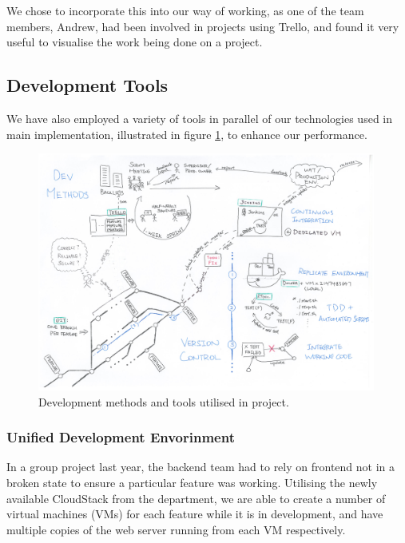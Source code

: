 \documentclass[a4paper, titlepage]{article}
\begin{document}
We chose to incorporate this into our way of working, as one of the team members, Andrew, had been involved in projects using Trello, and found it very useful to visualise the work being done on a project.


\subsection{Development Tools}
We have also employed a variety of tools in parallel of our technologies used
in main implementation, illustrated in figure \ref{fig:projman_devtools}, to
enhance our performance.

\begin{figure}[h!]
  \centering
    \includegraphics[width = 0.99\textwidth]{./projman/devtools.pdf}
  \caption{Development methods and tools utilised in project.}
  \label{fig:projman_devtools}
\end{figure}

\subsubsection{Unified Development Envorinment} \label{sec:projman_devenv}


In a group project last year, the backend team had to rely on frontend not in a broken state to ensure a 
particular feature was working. Utilising the newly available CloudStack from the department,
we are able to create a number of virtual machines (VMs) for each feature while it is in development,
and have multiple copies of the web server running from each VM respectively.
\end{document}
